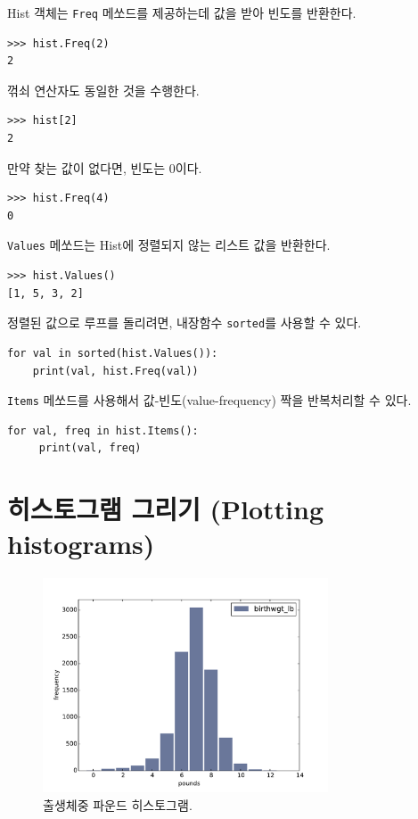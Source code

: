 Hist 객체는 {\tt Freq} 메쏘드를 제공하는데 값을 받아 빈도를 반환한다.

%
\begin{verbatim}
>>> hist.Freq(2)
2
\end{verbatim}

꺾쇠 연산자도 동일한 것을 수행한다.

%
\begin{verbatim}
>>> hist[2]
2
\end{verbatim}

만약 찾는 값이 없다면, 빈도는 0이다.

%
\begin{verbatim}
>>> hist.Freq(4)
0
\end{verbatim}

{\tt Values} 메쏘드는 Hist에 정렬되지 않는 리스트 값을 반환한다.
%
\begin{verbatim}
>>> hist.Values()
[1, 5, 3, 2]
\end{verbatim}

정렬된 값으로 루프를 돌리려면, 내장함수 {\tt sorted}를 사용할 수 있다.

%
\begin{verbatim}
for val in sorted(hist.Values()):
    print(val, hist.Freq(val))
\end{verbatim}

{\tt Items} 메쏘드를 사용해서 값-빈도(value-frequency) 짝을 반복처리할 수 있다.

%
\begin{verbatim}
for val, freq in hist.Items():
     print(val, freq)
\end{verbatim}


\section{히스토그램 그리기 (Plotting histograms)}

\begin{figure}
\centerline{\includegraphics[height=2.5in]{figs/first_wgt_lb_hist.pdf}}
\caption{출생체중 파운드 히스토그램.}
\label{first_wgt_lb_hist}
\end{figure}

